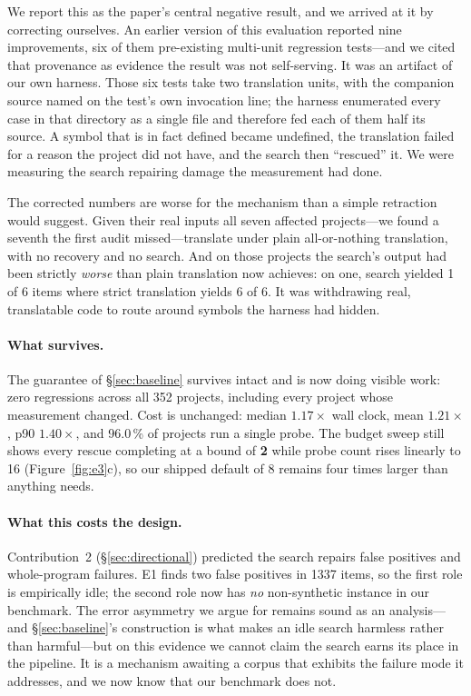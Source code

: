\documentclass[10pt,twocolumn]{article}
\begin{document}
We report this as the paper's central negative result, and we arrived at it by
correcting ourselves. An earlier version of this evaluation reported nine
improvements, six of them pre-existing multi-unit regression tests---and we
cited that provenance as evidence the result was not self-serving. It was an
artifact of our own harness. Those six tests take two translation units, with
the companion source named on the test's own invocation line; the harness
enumerated every case in that directory as a single file and therefore fed
each of them half its source. A symbol that is in fact defined became
undefined, the translation failed for a reason the project did not have, and
the search then ``rescued'' it. We were measuring the search repairing damage
the measurement had done.

The corrected numbers are worse for the mechanism than a simple retraction
would suggest. Given their real inputs all seven affected projects---we found
a seventh the first audit missed---translate under plain all-or-nothing
translation, with no recovery and no search. And on those projects the
search's output had been strictly \emph{worse} than plain translation now
achieves: on one, search yielded 1 of 6 items where strict translation yields
6 of 6. It was withdrawing real, translatable code to route around symbols
the harness had hidden.

\paragraph{What survives.} The guarantee of \S\ref{sec:baseline} survives
intact and is now doing visible work: zero regressions across all 352
projects, including every project whose measurement changed. Cost is
unchanged: median $1.17\times$ wall clock, mean $1.21\times$, p90
$1.40\times$, and 96.0\,\% of projects run a single probe. The budget sweep
still shows every rescue completing at a bound of \textbf{2} while probe
count rises linearly to 16 (Figure~\ref{fig:e3}c), so our shipped default of
8 remains four times larger than anything needs.

\paragraph{What this costs the design.} Contribution~2
(\S\ref{sec:directional}) predicted the search repairs false positives and
whole-program failures. E1 finds two false positives in 1337 items, so the
first role is empirically idle; the second role now has \emph{no}
non-synthetic instance in our benchmark. The error asymmetry we argue for
remains sound as an analysis---and \S\ref{sec:baseline}'s construction is what
makes an idle search harmless rather than harmful---but on this evidence we
cannot claim the search earns its place in the pipeline. It is a mechanism
awaiting a corpus that exhibits the failure mode it addresses, and we now know
that our benchmark does not.
\end{document}

